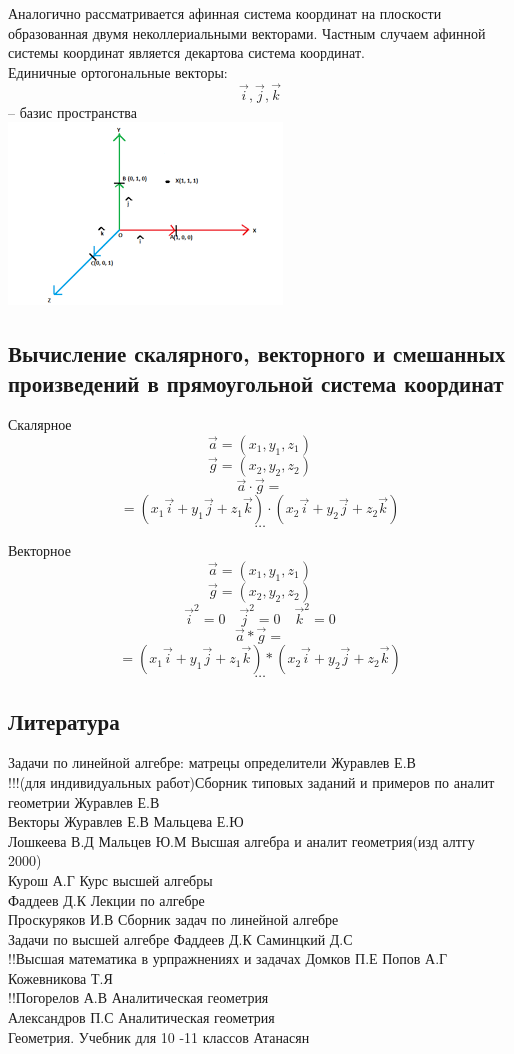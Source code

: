 \documentclass[a4paper, 12pt]{article}
\begin{document}
Аналогично рассматривается афинная система координат на плоскости образованная двумя неколлериальными векторами. Частным случаем афинной системы координат является декартова система координат.\\

Единичные ортогональные векторы:
\[
	\vec{i},\vec{j},\vec{k}   
\]
-- базис пространства\\
\includegraphics{orth_vec}\\

\subsection{Вычисление скалярного, векторного и смешанных произведений в прямоугольной система координат}

Скалярное
\[
	\vec{a} = (x_1,y_1,z_1) 
\]
\[
	\vec{g} = (x_2,y_2,z_2) 
\]
\[
	\vec{a}\cdot \vec{g} =   	
\]
\[
	= (x_1 \vec{i} + y_1 \vec{j} + z_1 \vec{k})\cdot(x_2 \vec{i} + y_2 \vec{j} + z_2 \vec{k})      
\]
\[
	\ldots
\]

Векторное
\[
	\vec{a} = (x_1,y_1,z_1) 
\]
\[
	\vec{g} = (x_2,y_2,z_2) 
\]
\[
	\vec{i}^2 = 0 \quad \vec{j}^2 = 0 \quad \vec{k}^2 = 0   	
\]
\[
	\vec{a}* \vec{g} =   	
\]
\[
	= (x_1 \vec{i} + y_1 \vec{j} + z_1 \vec{k})*(x_2 \vec{i} + y_2 \vec{j} + z_2 \vec{k})      
\]
\[
	\ldots
\]





\newpage
\subsection*{Литература}
Задачи по линейной алгебре: матрецы определители Журавлев Е.В\\
!!!(для индивидуальных работ)Сборник типовых заданий и примеров по аналит геометрии Журавлев Е.В\\
Векторы Журавлев Е.В Мальцева Е.Ю\\
Лошкеева В.Д Мальцев Ю.М Высшая алгебра и аналит геометрия(изд алтгу 2000)\\
Курош А.Г Курс высшей алгебры\\
Фаддеев Д.К Лекции по алгебре\\
Проскуряков И.В Сборник задач по линейной алгебре\\
Задачи по высшей алгебре Фаддеев Д.К Саминцкий Д.С\\
!!Высшая математика в урпражнениях и задачах Домков П.Е Попов А.Г Кожевникова Т.Я\\
!!Погорелов А.В Аналитическая геометрия\\
Александров П.С Аналитическая геометрия\\
Геометрия. Учебник для 10 -11 классов Атанасян\\
\end{document}

